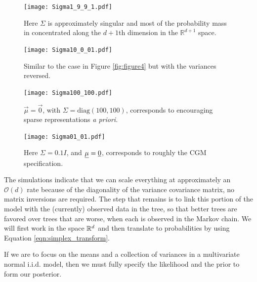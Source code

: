 \begin{figure}[ht]
\begin{minipage}[b]{0.45\linewidth}
\centering
\texttt{[image: Sigma1\_9\_9\_1.pdf]}
\caption[ALN plot $\Sigma$ numerically singular]{Here $\Sigma$ is approximately singular and most of the probability mass in concentrated along the $d+1$th dimension in the $\mathbb{R}^{d+1}$ space.  }
\label{fig:figure5}
\end{minipage}
\hspace{0.5cm}
\begin{minipage}[b]{0.45\linewidth}
\centering
\texttt{[image: Sigma10\_0\_01.pdf]}
\caption[Similar to the case in Figure \ref{fig:figure4} but with the variances reversed]{Similar to the case in Figure \ref{fig:figure4} but with the variances reversed.}
\label{fig:figure6}
\end{minipage}
\end{figure}

 \begin{figure}[ht]
\begin{minipage}[b]{0.45\linewidth}
\centering
\texttt{[image: Sigma100\_100.pdf]}
\caption[ALN plot with a zero vector mean and $\Sigma=\text{Diag}(100,100)$]{$\vec{\mu}=\vec{0}$, with
 $\Sigma= \text{diag}(100, 100)$, corresponds to encouraging sparse representations \emph{a priori}.  }
\label{fig:figure7}
\end{minipage}
\hspace{0.5cm}
\begin{minipage}[b]{0.45\linewidth}
\centering
\texttt{[image: Sigma01\_01.pdf]}
\caption[ALN plot approximating the CGM model]{Here $\Sigma=0.1I$, and $\underline{\mu}=\underline{{0}}$, corresponds to roughly the CGM specification.}
\label{fig:figure8}
\end{minipage}
\end{figure}

 The simulations indicate that we can scale everything at approximately an $\mathcal{O}(d)$ rate because of the diagonality of the variance covariance matrix, no matrix inversions are required. The step that remains is to link this portion of the model with the (currently) observed data in the tree, so that better trees are favored over trees that are worse, when each is observed in the Markov chain. We will first work in the space $\mathbb{R}^{d}$ and then translate to probabilities by using Equation \ref{eqn:simplex_transform}.  
 
 If we are to focus on the means and a collection of variances in a multivariate normal i.i.d. model, then we must fully specify the likelihood and the prior to form our posterior. 
 
